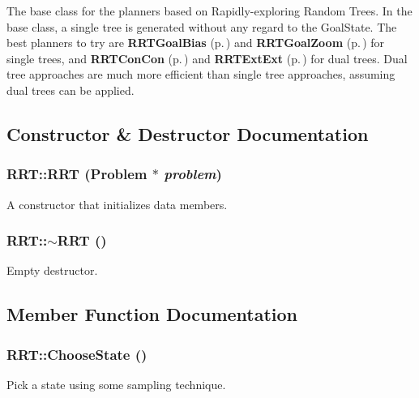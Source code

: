 The base class for the planners based on Rapidly-exploring  Random Trees. In the base class, a single tree is generated without any regard to the Goal\-State. The best planners to try are  {\bf RRTGoal\-Bias} {\rm (p.\,\pageref{class_RRTGoalBias})} and {\bf RRTGoal\-Zoom} {\rm (p.\,\pageref{class_RRTGoalZoom})} for single trees, and {\bf RRTCon\-Con} {\rm (p.\,\pageref{class_RRTConCon})} and  {\bf RRTExt\-Ext} {\rm (p.\,\pageref{class_RRTExtExt})} for dual trees. Dual tree approaches are much more efficient than single tree approaches, assuming dual trees can be applied. 



\subsection{Constructor \& Destructor Documentation}
\subsubsection{\setlength{\rightskip}{0pt plus 5cm}RRT::RRT ({\bf Problem} $\ast$ {\em problem})}\label{class_RRT_a0}


A constructor that initializes data members.

\subsubsection{\setlength{\rightskip}{0pt plus 5cm}RRT::$\sim$RRT ()\hspace{0.3cm}{\tt  [inline, virtual]}}\label{class_RRT_a1}


Empty destructor.



\subsection{Member Function Documentation}
\subsubsection{ RRT::Choose\-State ()\hspace{0.3cm}{\tt  [protected, virtual]}}\label{class_RRT_b4}


Pick a state using some sampling technique.



